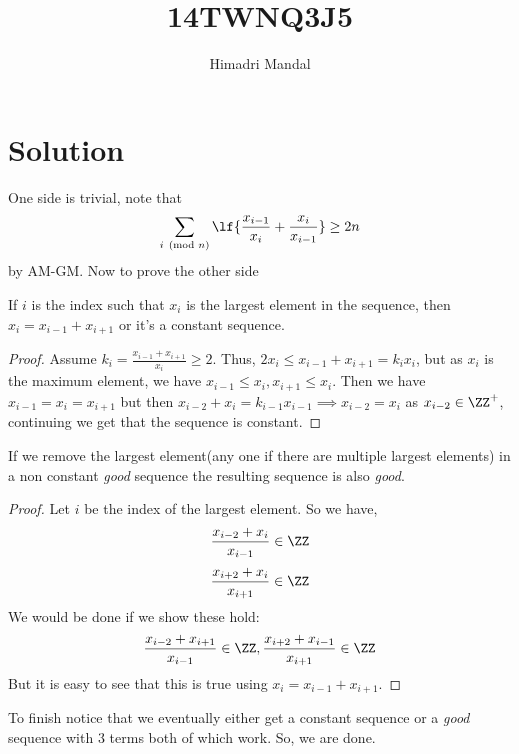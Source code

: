 \documentclass[11pt]{scrartcl}
\title{14TWNQ3J5}
\author{Himadri Mandal}
\begin{document}
\maketitle

\section{Solution}
\begin{soln}
	
One side is trivial, note that 
$$\sum_{i\pmod{n}}\lf{\frac{x_{i-1}}{x_i} + \frac{x_i}{x_{i-1}}} \geq 2n$$
by AM-GM.
Now to prove the other side
\begin{claim}
	If $i$ is the index such that $x_i$ is the largest element in the sequence, then $x_i = x_{i-1} + x_{i+1}$ or it's a constant sequence.
\end{claim}
\begin{proof}
	Assume $k_i = \frac{x_{i-1} + x_{i+1}}{x_i} \geq 2$.
	Thus, $2x_i \leq x_{i-1} + x_{i+1} = k_i x_i$, but as $x_i$ is the maximum element, we have $x_{i-1} \leq x_i, x_{i+1} \leq x_i$. 
	Then we have $x_{i-1} = x_i = x_{i+1}$ but then $x_{i-2}+x_{i} = k_{i-1}x_{i-1} \implies x_{i-2} = x_{i}$ as $x_{i-2} \in \ZZ^{+}$, continuing we get that the sequence is constant. 
\end{proof}
\begin{claim}
	If we remove the largest element(any one if there are multiple largest elements) in a non constant \textit{good} sequence the resulting sequence is also \textit{good}.
\end{claim}
\begin{proof}
	Let $i$ be the index of the largest element. 
	So we have, 
	$$ \frac{x_{i-2} + x_{i}}{x_{i-1}} \in \ZZ $$
	$$ \frac{x_{i+2} + x_{i}}{x_{i+1}} \in \ZZ$$
	We would be done if we show these hold:
	$$\frac{x_{i-2} + x_{i+1}}{x_{i-1}} \in \ZZ
	, \frac{x_{i+2}+x_{i-1}}{x_{i+1}} \in \ZZ$$
	But it is easy to see that this is true using $x_i = x_{i-1} + x_{i+1}$.
\end{proof}
To finish notice that we eventually either get a constant sequence or a \textit{good} sequence with $3$ terms both of which work. So, we are done.
\end{soln}
\end{document}
